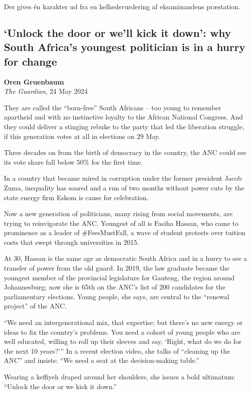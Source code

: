 \documentclass[10pt,a4paper]{article}
\begin{document}
Der gives én karakter ud fra en helhedsvurdering af eksaminandens præstation.

\clearpage
\subsection{`Unlock the door or we'll kick it down': why South Africa's youngest politician is in a hurry for change}
\textbf{Oren Gruenbaum}\\
\textit{The Guardian}, 24 May 2024

\begin{linenumbers}
They are called the “born-free” South Africans – too young to remember apartheid and with no instinctive loyalty to the African National Congress. And they could deliver a stinging rebuke to the party that led the liberation struggle, if this generation votes at all in elections on 29 May.

Three decades on from the birth of democracy in the country, the ANC could see its vote share fall below 50\% for the first time.

In a country that became mired in corruption under the former president Jacob Zuma, inequality has soared and a run of two months without power cuts by the state energy firm Eskom is cause for celebration.

Now a new generation of politicians, many rising from social movements, are trying to reinvigorate the ANC. Youngest of all is Fasiha Hassan, who came to prominence as a leader of \#FeesMustFall, a wave of student protests over tuition costs that swept through universities in 2015.

At 30, Hassan is the same age as democratic South Africa and in a hurry to see a transfer of power from the old guard. In 2019, the law graduate became the youngest member of the provincial legislature for Gauteng, the region around Johannesburg; now she is 65th on the ANC’s list of 200 candidates for the parliamentary elections. Young people, she says, are central to the “renewal project” of the ANC.

“We need an intergenerational mix, that expertise; but there’s no new energy or ideas to fix the country’s problems. You need a cohort of young people who are well educated, willing to roll up their sleeves and say, ‘Right, what do we do for the next 10 years?’” In a recent election video, she talks of “cleaning up the ANC” and insists: “We need a seat at the decision-making table.”

Wearing a keffiyeh draped around her shoulders, she issues a bold ultimatum: “Unlock the door or we kick it down.”


\end{linenumbers}
\end{document}
